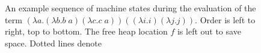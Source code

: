\begin{figure}
\caption{An example sequence of machine states during the evaluation of the term
$(\lambda a.(\lambda b.b \; a) (\lambda c.c
\; a)) ((\lambda i.i) (\lambda j.j))$. Order is left to right, top to bottom.
The free heap location $f$ is left out to save space. Dotted lines denote }
\label{fig:states}
\end{figure}
